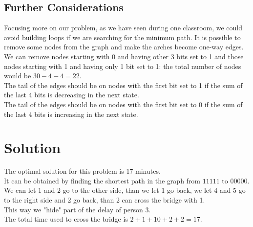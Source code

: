 \documentclass[1pt]{article}
\begin{document}
		\subsection{Further Considerations}
			Focusing more on our problem, as we have seen during one classroom, we could avoid building loops if we are searching for the minimum path. It is possible to remove some nodes from the graph and make the arches become one-way edges.\\ 
			We can remove nodes starting with 0 and having other 3 bits set to 1 and those nodes starting with 1 and having only 1 bit set to 1: the total number of nodes would be $30 - 4 - 4 = 22$.\\
			The tail of the edges should be on nodes with the first bit set to 1 if the sum of the last 4 bits is decreasing in the next state. \\
			The tail of the edges should be on nodes with the first bit set to 0 if the sum of the last 4 bits is increasing in the next state.

	\section{Solution}
		The optimal solution for this problem is 17 minutes.\\
		It can be obtained by finding the shortest path in the graph from $11111$ to $00000$.\\
		We can let 1 and 2 go to the other side, than we let 1 go back, we let 4 and 5 go to the right side and 2 go back, than 2 can cross the bridge with 1.\\
		This way we "hide" part of the delay of person 3.\\
		The total time used to cross the bridge is $2 + 1 + 10 + 2 + 2 = 17$.
		
\end{document}

